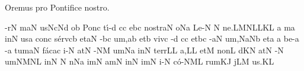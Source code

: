 \beginhymn Oremus pro Pontifice nostro.

\nosolesmescustos
{}
\Internote
\initiumgregorianum
{}%
\sgn {}-r\punctum N\egn
{}m\clivis aN\egn
\sgn {}us\pes Nc\augmentumduplex Nd\egn
\spatium
{}o{}\punctum b\egn
\spatium
\sgn Pon\engl{}\punctum c\egn
\sgn t{\'\i}-\punctum d\egn
{}c\punctum c\egn
\sgn {}e{}\pes bc\egn
\spatium
\sgn no{str}\clivis aN\egn
\sgn {}o{}\pes Na\egn
\spatium
\sgn Le{-}\punctum N\egn
{}\punctum N\egn
\sgn ne.\pes LM\spatiumparvum\clivis NL\spatiumparvum\punctum L\spatiumparvum\punctum K\augmentum L\egn
\spatium
\divisiofinalis
\custos a
\lineaproxima
{}m\punctum a\egn
\sgn {}in\punctum N\egn
\sgn {}us\punctum a\egn
\spatium
\sgn con\punctum c\egn
\sgn s{\'e}{rv}\clivis cb\egn
\sgn {}et\clivis aN\egn
\spatium
{}-\pes bc\egn
\sgn {}u{m,}\punctum a\augmentum b\egn
\spatium
\divisiominor
\spatium
\sgn {}et\punctum b\egn
\spatium
\sgn viv\punctum c\egn
\sgn {}{\'\i}-\punctum d\egn
{}c\punctum c\egn
\sgn {}et\pes bc\egn
\spatium
{}-\clivis aN\egn
\sgn {}u{m,}\pes Na\augmentumduplex Nb\egn
\spatium
\divisiominor
\spatium
\sgn {}et\punctum a\egn
\spatium
\custos a
\lineaproxima
\sgn be-\punctum a\egn
{}-\punctum a\egn
\sgn tum\clivis aN\egn
\spatium
\sgn f{\'a}c\pes ac\egn
\sgn {}i-\punctum N\egn
\sgn {}at\punctum N\egn
\spatium
{}-\clivis NM\egn
\sgn {}um\pes Na\egn
\spatium
\sgn {}in\punctum N\egn
\spatium
\sgn t{e}{rr}\punctum L\augmentum L\egn
\sgn {}a,\punctum L\augmentum L\egn
\spatium
\divisiomaior
\spatium
\sgn {}et\punctum M\egn
\spatium
\sgn non\punctum L\egn
\spatium
{}d\pes KN\egn
\sgn {}at\punctum N\egn
\spatium
{}-\punctum N\egn
\sgn {}um\clivis NM\augmentumduplex NL\egn
\spatium
\divisiominor
\spatium
\sgn {}in\punctum N\egn
\spatium
\custos N
\lineaproxima
{}n\pes Na\egn
\sgn {}im\punctum N\egn
\sgn {}am\punctum N\egn
\spatium
\sgn {}in\punctum N\egn
\sgn {}im\punctum N\egn
\sgn {}i-\punctum N\egn
\sgn c{\'o}-\climacus NML\egn
\sgn rum\clivis KJ\egn
\spatium
{}j\pes LM\egn
\sgn {}u{s.}\punctum K\augmentum L\egn
\Finisgregoriana

\bigskip

